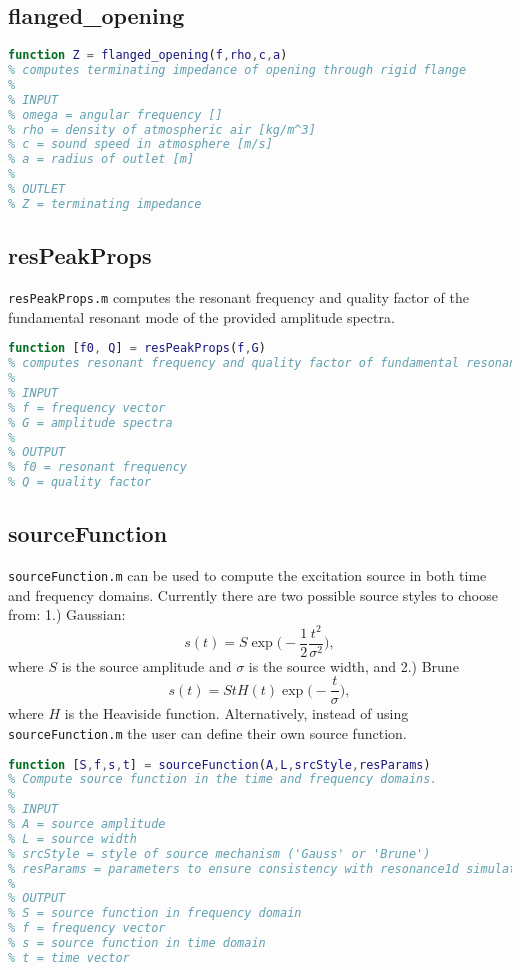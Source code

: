 \documentclass[10pt]{article}
\begin{document}
\subsection{flanged\_opening}
\begin{lstlisting}[language=Matlab]
function Z = flanged_opening(f,rho,c,a)
% computes terminating impedance of opening through rigid flange
%
% INPUT
% omega = angular frequency []
% rho = density of atmospheric air [kg/m^3]
% c = sound speed in atmosphere [m/s]
% a = radius of outlet [m]
%
% OUTLET
% Z = terminating impedance
\end{lstlisting}


\subsection{resPeakProps}
\texttt{resPeakProps.m} computes the resonant frequency and quality factor of the fundamental resonant mode of the provided amplitude spectra. 

\begin{lstlisting}[language=Matlab]
function [f0, Q] = resPeakProps(f,G)
% computes resonant frequency and quality factor of fundamental resonant mode.
%
% INPUT
% f = frequency vector
% G = amplitude spectra
%
% OUTPUT
% f0 = resonant frequency
% Q = quality factor
\end{lstlisting}


\subsection{sourceFunction}
\texttt{sourceFunction.m} can be used to compute the excitation source in both time and frequency domains. Currently there are two possible source styles to choose from: 1.) Gaussian:
\begin{equation}
s(t) = S\exp \bigg( - \frac{1}{2} \frac{t^2}{\sigma^2} \bigg),
\end{equation}
where $S$ is the source amplitude and $\sigma$ is the source width, and 2.) Brune
\begin{equation}
s(t) = StH(t) \exp \bigg( - \frac{t}{\sigma} \bigg),
\end{equation}
where $H$ is the Heaviside function. Alternatively, instead of using \texttt{sourceFunction.m} the user can define their own source function.

\begin{lstlisting}[language=Matlab]
function [S,f,s,t] = sourceFunction(A,L,srcStyle,resParams)
% Compute source function in the time and frequency domains.
% 
% INPUT
% A = source amplitude
% L = source width
% srcStyle = style of source mechanism ('Gauss' or 'Brune')
% resParams = parameters to ensure consistency with resonance1d simulation
%
% OUTPUT
% S = source function in frequency domain
% f = frequency vector
% s = source function in time domain
% t = time vector
\end{lstlisting}



\newpage


\end{document}
